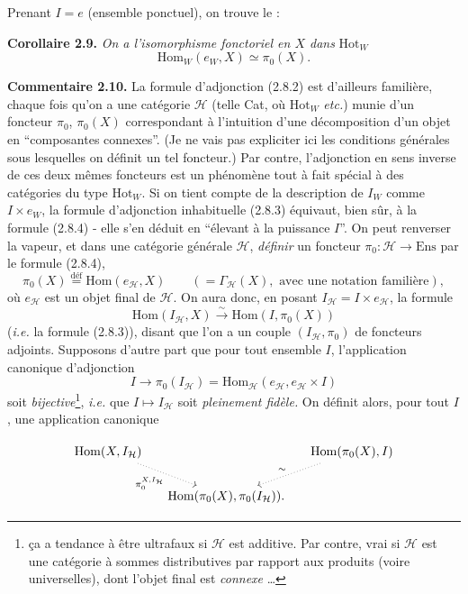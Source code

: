 \documentclass[11pt]{article}
\newcommand{\printedpage}[1]{\marginpar{\footnotesize p.~#1}}
\newcommand{\msp}[1]{\marginpar{\footnotesize [#1]}}
\newcommand{\Hom}{\operatorname{Hom}}
\begin{document}
Prenant $I = e$ (ensemble ponctuel), on trouve le :

\textbf{Corollaire 2.9.} \textit{On a l'isomorphisme fonctoriel en $X$ dans} $\mathrm{Hot}_W$
\[
\boxed{\mathrm{Hom}_W(e_W, X) \simeq \pi_0(X).} \tag*{(2.8.4)}
\]

\textbf{Commentaire 2.10.} La formule d'adjonction (2.8.2) est d'ailleurs familière, chaque fois qu'on a une catégorie $\mathcal{H}$ (telle Cat, où $\mathrm{Hot}_W$ \textit{etc.}) %
munie d'un foncteur $\pi_0$, $\pi_0(X)$ correspondant à l'intuition d'une décomposition d'un objet en “composantes connexes”. (Je ne vais pas expliciter ici les conditions générales sous lesquelles on définit un tel foncteur.) Par contre, l'adjonction en sens inverse de ces deux mêmes foncteurs est un phénomène tout à fait spécial à des catégories \msp{page 16}du type $\mathrm{Hot}_W$. Si on tient compte de la description de $I_W$ comme $I \times e_W$, la formule d'adjonction inhabituelle (2.8.3) équivaut, bien sûr, à la formule (2.8.4) - elle s'en déduit en “élevant à la puissance $I$”. On peut renverser la vapeur, et dans une catégorie générale $\mathcal{H}$, \textit{définir} un foncteur $\pi_0 : \mathcal{H} \longrightarrow \mathrm{Ens}$ par le formule (2.8.4), %
\[
\pi_0(X) \overset{\text{déf}}{=} \mathrm{Hom}(e_{\mathcal{H}}, X) \qquad (= \Gamma_{\mathcal{H}}(X), \text{ avec une notation familière}),
\]
où $e_{\mathcal{H}}$ est un objet final de $\mathcal{H}$. On aura donc, en posant $I_{\mathcal{H}} = I \times e_{\mathcal{H}}$, la formule
\[
\mathrm{Hom}(I_{\mathcal{H}}, X) \xrightarrow{\ \sim\ } \mathrm{Hom}(I, \pi_0(X))
\]
(\textit{i.e.} la formule (2.8.3)), disant que l'on a un couple $(I_{\mathcal{H}}, \pi_0)$ de foncteurs adjoints. Supposons d'autre part que pour tout ensemble $I$, l'application canonique d'adjonction
\[
I \longrightarrow \pi_0(I_{\mathcal{H}}) = \mathrm{Hom}_{\mathcal{H}}(e_{\mathcal{H}}, e_{\mathcal{H}} \times I)
\]
soit \textit{bijective}\footnote{ça a tendance à être ultrafaux si $\mathcal{H}$ est additive. Par contre, vrai si $\mathcal{H}$ est une catégorie à sommes distributives par rapport aux produits (voire universelles), dont l'objet final est \textit{connexe} \ldots}, \textit{i.e.} que $I \longmapsto I_{\mathcal{H}}$ soit \textit{pleinement fidèle.} On définit alors, pour tout $I$, une application canonique

\printedpage{9}

\[
\begin{tikzcd}[column sep=small]
\Hom(X,I_{\mathcal{H}}) \arrow[dr,dotted,"\pi_0^{X,I_{\mathcal{H}}}"'] & & \Hom(\pi_0(X),I) \arrow[dl,dotted,"\sim"'] \\ %
& \Hom(\pi_0(X),\pi_0(I_{\mathcal{H}})). &
\end{tikzcd}
\]
\end{document}
